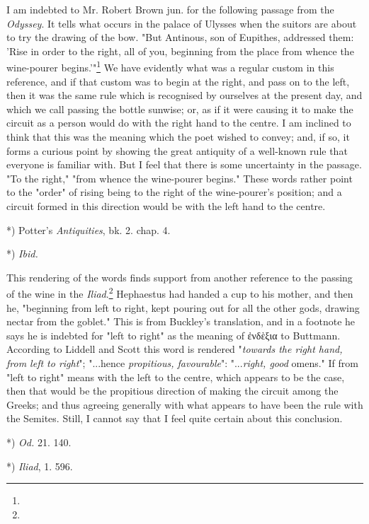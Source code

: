 \documentclass[a4paper, 11pt, oneside, polutonikogreek, english]{article}
\begin{document}
I am indebted to Mr. Robert Brown jun. for the following passage from the \emph{Odyssey}. It tells what occurs in the palace of Ulysses when the suitors are about to try the drawing of the bow. "But Antinous, son of Eupithes, addressed them: 'Rise in order to the right, all of you, beginning from the place from whence the wine-pourer begins.'"\footnote{} We have evidently what was a regular custom in this reference, and if that custom was to begin at the right, and pass on to the left, then it was the same rule which is recognised by ourselves at the present day, and which we call passing the bottle sunwise; or, as if it were causing it to make the circuit as a person would do with the right hand to the centre. I am inclined to think that this was the meaning which the poet wished to convey; and, if so, it forms a curious point by showing the great antiquity of a well-known rule that everyone is familiar with. But I feel that there is some uncertainty in the passage. "To the right," "from whence the wine-pourer begins." These words rather point to the "order" of rising being to the right of the wine-pourer's position; and a circuit formed in this direction would be with the left hand to the centre.

*) Potter's \emph{Antiquities}, bk. 2. chap. 4.

*) \emph{Ibid.}

This rendering of the words finds support from another reference to the passing of the wine in the \emph{Iliad}.\footnote{} Hephaestus had handed a cup to his mother, and then he, "beginning from left to right, kept pouring out for all the other gods, drawing nectar from the goblet." This is from Buckley's translation, and in a footnote he says he is indebted for "left to right" as the meaning of ἐνδὲξια to Buttmann. According to Liddell and Scott this word is rendered "\emph{towards the right hand, from left to right}"; "...hence \emph{propitious, favourable}": "...\emph{right, good} omens." If from "left to right" means with the left to the centre, which appears to be the case, then that would be the propitious direction of making the circuit among the Greeks; and thus agreeing generally with what appears to have been the rule with the Semites. Still, I cannot say that I feel quite certain about this conclusion.

*) \emph{Od.} 21. 140.

*) \emph{Iliad}, 1. 596.
\end{document}
